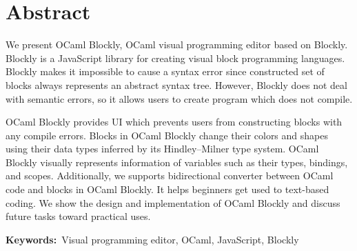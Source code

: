 \chapter*{Abstract}

We present OCaml Blockly, OCaml visual programming editor based on Blockly.
Blockly is a JavaScript library for creating visual block programming languages.
Blockly makes it impossible to cause a syntax error since constructed set of blocks always represents an abstract syntax tree.
However, Blockly does not deal with semantic errors, so it allows users to create program which does not compile.

OCaml Blockly provides UI which prevents users from constructing blocks with any compile errors.
Blocks in OCaml Blockly change their colors and shapes using their data types inferred by its Hindley–Milner type system.
OCaml Blockly visually represents information of variables such as their types, bindings, and scopes.
Additionally, we supports bidirectional converter between OCaml code and blocks in OCaml Blockly.
It helps beginners get used to text-based coding.
We show the design and implementation of OCaml Blockly and discuss future tasks toward practical uses.

{\bf Keywords:}\ Visual programming editor, OCaml, JavaScript, Blockly
